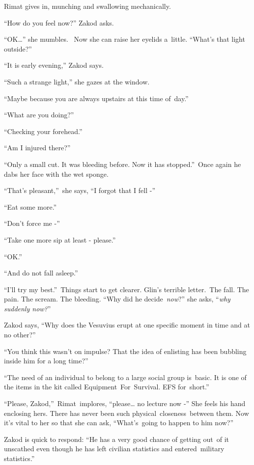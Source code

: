 \documentclass[twoside,11pt]{book}
\begin{document}
Rimat gives in, munching and swallowing mechanically.

{}``How do you feel now?'' Zakod asks. \ 

{}``OK{\dots}'' she mumbles.~ Now she can raise her eyelids a\ little. ``What{}'s that light outside?''\ 

{}``It is early evening,'' Zakod says.\ 

{}``Such a strange light,'' she gazes at the window.\ 

{}``Maybe because you are always upstairs at this time of~day.''\ 

{}``What are you doing?''\ 

{}``Checking your forehead.''\ 

{}``Am I injured there?''\ 

{}``Only a small cut. It was bleeding before. Now it has stopped.''\ Once again he dabs her face with the wet sponge. 

{}``That's pleasant,''\ she says, ``I forgot that I fell -''\ 

{}``Eat some more.{}''

{}``Don't force me -{}''\ 

{}``Take one more sip at least - please.''\ 

{}``OK.{}''\ 

{}``And do not fall asleep.''

{}``I{}'ll try my best.{}''\ Things start to get clearer. Glin{}'s terrible letter.\ The fall. The pain. The scream. The
bleeding. {}``Why did he decide\ \textit{now}?{}'' she asks, ``\textit{why suddenly now?}{}''

Zakod says, ``Why does the Vesuvius erupt at one specific moment in time and at no other?''\ 

{}``You think this wasn't on impulse? That the idea of enlisting has been bubbling inside him for a long
time?'' 

``The need of an individual to belong to a large social group is\ basic. It is one of the items in the kit
called Equipment\ For\ Survival. EFS for\ short.''\ 

{}``Please, Zakod,''\ Rimat~implores, ``please{\dots} no lecture now -'' She feels his hand enclosing hers. There has
never been such physical\ closeness{\ }between them. Now it{}'s vital to her so that she can ask,
``What's\ going to happen to him now?''\ 

Zakod is quick to respond: ``He has a very good chance of getting out\ of it unscathed even though he has
left civilian statistics and entered\ military statistics.''\ 
\end{document}
